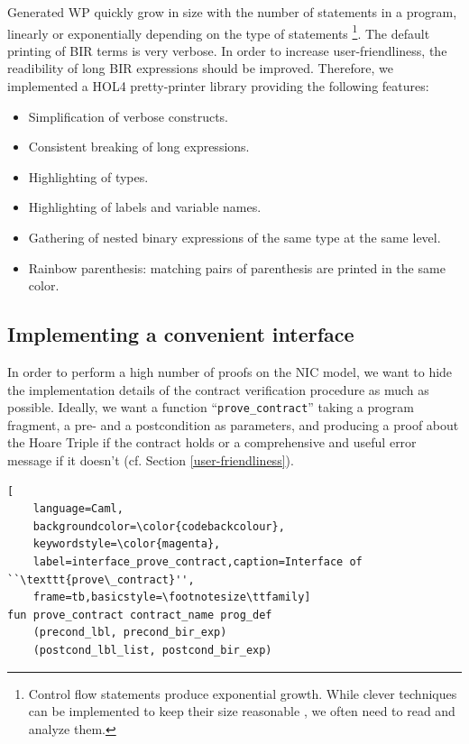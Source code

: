 \documentclass[10pt,a4paper]{article}
\begin{document}
\begin{multicols}{2}
Generated WP quickly grow in size with the number of statements in a program, linearly or exponentially depending on the type of statements \footnote{Control flow statements produce exponential growth. While clever techniques can be implemented to keep their size reasonable \cite{lindner_trabin:_2019}, we often need to read and analyze them.}. The default printing of BIR terms is very verbose. In order to increase user-friendliness, the readibility of long BIR expressions should be improved. Therefore, we implemented a HOL4 pretty-printer library providing the following features:

\begin{itemize}
    \item Simplification of verbose constructs.
    \item Consistent breaking of long expressions.
    \item Highlighting of types.
    \item Highlighting of labels and variable names.
    \item Gathering of nested binary expressions of the same type at the same level.
    \item Rainbow parenthesis: matching pairs of parenthesis are printed in the same color.
\end{itemize}

\subsection{Implementing a convenient interface} \label{impl_convenient_ht_interface}

In order to perform a high number of proofs on the {NIC} model, we want to hide the implementation details of the contract verification procedure as much as possible. Ideally, we want a function ``\texttt{prove\_contract}'' taking a program fragment, a pre- and a postcondition as parameters, and producing a proof about the Hoare Triple if the contract holds or a comprehensive and useful error message if it doesn't (cf. Section \ref{user-friendliness}).
%
\begin{lstlisting}[
    language=Caml,
    backgroundcolor=\color{codebackcolour},
    keywordstyle=\color{magenta},
    label=interface_prove_contract,caption=Interface of ``\texttt{prove\_contract}'',
    frame=tb,basicstyle=\footnotesize\ttfamily]
fun prove_contract contract_name prog_def
    (precond_lbl, precond_bir_exp)
    (postcond_lbl_list, postcond_bir_exp)
\end{lstlisting}


\end{multicols}
\end{document}
